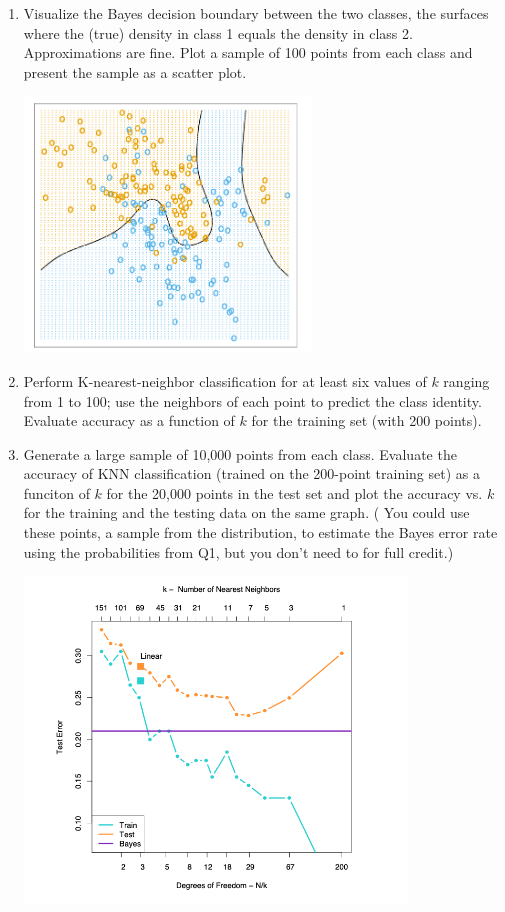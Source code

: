 \documentclass[12pt]{book}
\theoremstyle{definition}
\begin{document}
\begin{enumerate}
\item
 Visualize the Bayes decision boundary between the two classes, the surfaces where the (true) density in class 1 equals the density in class 2.  Approximations are fine.
Plot a sample of 100 points from each class and present the sample as a scatter plot.  

\includegraphics[width=3in]{hastie-bayesian.png}

\item
Perform K-nearest-neighbor classification for at least six values of $k$ ranging from 1 to 100; use the neighbors of each point to predict the class identity.  Evaluate accuracy as a function of $k$ for the training set (with 200 points).

\item
Generate a large sample of 10,000 points from each class.
Evaluate the accuracy of KNN classification (trained on the 200-point training set)  as a funciton of $k$ for the 20,000 points in the test set and plot the accuracy vs. $k$ for the training and the testing data on the same graph.    ( You could use these points, a sample from the distribution, to estimate the Bayes error rate using the probabilities from Q1, but you don't need to for full credit.)

\includegraphics[width=4in]{hastie-generalization.png}


\end{enumerate}
\end{document}

